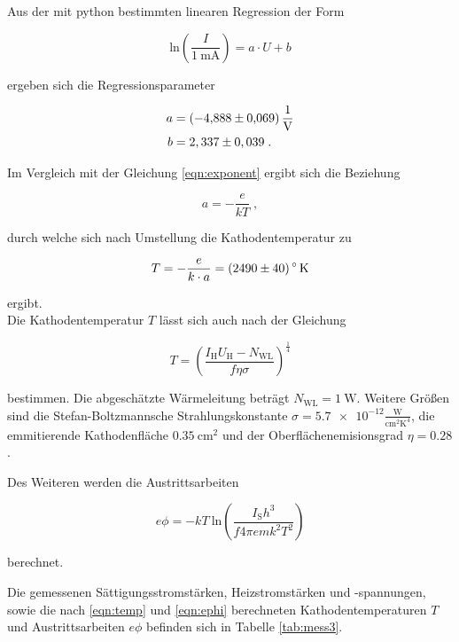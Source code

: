 Aus der mit python bestimmten linearen Regression der Form 

\begin{equation*}
    \text{ln} \left(\frac{I}{\SI{1}{\milli\ampere}} \right) 
    = a \cdot U + b
\end{equation*}

ergeben sich die Regressionsparameter 

\begin{align*}
    a &= \SI{-4.888 +- 0.069}{\per\volt}\\
    b &= 2,337 \pm 0,039 \; .
\end{align*}

Im Vergleich mit der Gleichung \eqref{eqn:exponent} ergibt sich die Beziehung

\begin{equation*}
      a = - \frac{e}{kT} \; ,
\end{equation*}

durch welche sich nach Umstellung die Kathodentemperatur zu

\begin{equation}
      T = - \frac{e}{k \cdot a} = \SI{2490 +- 40}{\degree\kelvin}
\end{equation}

ergibt. \\

Die Kathodentemperatur $T$ lässt sich auch nach der Gleichung

\begin{equation}
    T = \left( \frac{I_\text{H} U_\text{H} - N_\text{WL}}{f \eta \sigma} \right)^{\frac{1}{4}}
    \label{eqn:temp}
\end{equation}

bestimmen. Die abgeschätzte Wärmeleitung  beträgt $N_\text{WL} = \SI{1}{\watt}$.
Weitere Größen sind die Stefan-Boltzmannsche Strahlungskonstante 
$\sigma = \num{5.7e-12}\frac{\text{W}}{\text{cm}^2\text{K}^4}$, die emmitierende Kathodenfläche
$\SI{0.35}{\centi\meter\squared}$ und der Oberflächenemisionsgrad $\eta = \num{0.28}$.

Des Weiteren werden die Austrittsarbeiten 

\begin{equation}
    e \phi = -k T \: \text{ln} \left( \frac{I_\text{S} h^3}{f 4 \pi e m k^2 T^2} \right)
    \label{eqn:ephi}
\end{equation}

berechnet.



Die gemessenen Sättigungsstromstärken, Heizstromstärken und -spannungen, sowie die nach 
\eqref{eqn:temp} und \eqref{eqn:ephi} berechneten Kathodentemperaturen $T$ und 
Austrittsarbeiten $e\phi$ befinden sich in Tabelle \ref{tab:mess3}.

